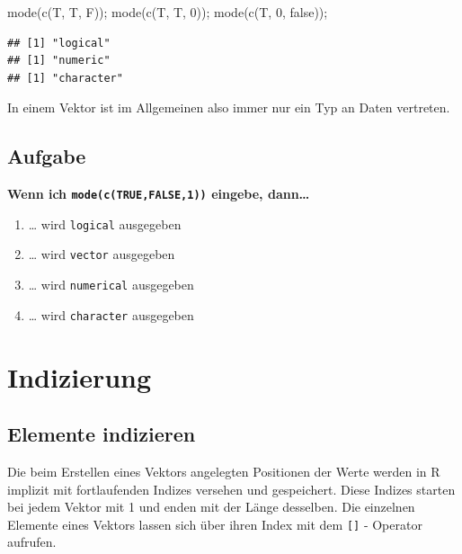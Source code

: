 \documentclass[
]{book}
\newenvironment{Shaded}{\begin{snugshade}}{\end{snugshade}}
\newcommand{\DecValTok}[1]{\textcolor[rgb]{0.00,0.00,0.81}{#1}}
\newcommand{\FunctionTok}[1]{\textcolor[rgb]{0.00,0.00,0.00}{#1}}
\newcommand{\NormalTok}[1]{#1}
\newcommand{\StringTok}[1]{\textcolor[rgb]{0.31,0.60,0.02}{#1}}
\providecommand{\tightlist}{%
  \setlength{\itemsep}{0pt}\setlength{\parskip}{0pt}}
\begin{document}
\begin{Shaded}
\begin{Highlighting}[]
\FunctionTok{mode}\NormalTok{(}\FunctionTok{c}\NormalTok{(T, T, F));}
\FunctionTok{mode}\NormalTok{(}\FunctionTok{c}\NormalTok{(T, T, }\DecValTok{0}\NormalTok{));}
\FunctionTok{mode}\NormalTok{(}\FunctionTok{c}\NormalTok{(T, }\DecValTok{0}\NormalTok{, }\StringTok{\textquotesingle{}false\textquotesingle{}}\NormalTok{));}
\end{Highlighting}
\end{Shaded}

\begin{verbatim}
## [1] "logical"
## [1] "numeric"
## [1] "character"
\end{verbatim}

In einem Vektor ist im Allgemeinen also immer nur ein Typ an Daten vertreten.

\hypertarget{aufgabe-2}{%
\subsection{Aufgabe}\label{aufgabe-2}}

\textbf{Wenn ich \texttt{mode(c(\textquotesingle{}TRUE\textquotesingle{},FALSE,1))} eingebe, dann\ldots{}}

\begin{enumerate}
\def\labelenumi{\Alph{enumi})}
\tightlist
\item
  \ldots{} wird \texttt{logical} ausgegeben
\item
  \ldots{} wird \texttt{vector} ausgegeben
\item
  \ldots{} wird \texttt{numerical} ausgegeben
\item
  \ldots{} wird \texttt{character} ausgegeben
\end{enumerate}

\hypertarget{indizierung}{%
\section{Indizierung}\label{indizierung}}

\hypertarget{elemente-indizieren}{%
\subsection{Elemente indizieren}\label{elemente-indizieren}}

Die beim Erstellen eines Vektors angelegten Positionen der Werte werden in R implizit mit fortlaufenden Indizes versehen und gespeichert. Diese Indizes starten bei jedem Vektor mit 1 und enden mit der Länge desselben.
Die einzelnen Elemente eines Vektors lassen sich über ihren Index mit dem \texttt{{[}{]}} - Operator aufrufen.
\end{document}
